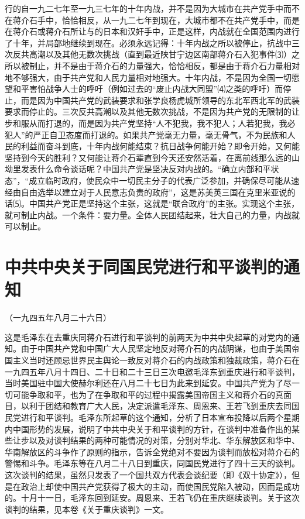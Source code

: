 \documentclass[UTF-8, a5paper, 12pt]{ctexart}
\begin{document}
行的自一九二七年至一九三七年的十年内战，并不是因为大城市在共产党手中而不在蒋介石手中，恰恰相反，从一九二七年到现在，大城市都不在共产党手中，而是在蒋介石或蒋介石所让与的日本和汉奸手中，正是这样，内战就在全国范围内进行了十年，并局部地继续到现在。必须永远记得：十年内战之所以被停止，抗战中三次反共高潮以及其他无数次挑战（直到最近陕甘宁边区南部蒋介石入犯事件⑶）之所以被制止，并不是由于蒋介石的力量强大，恰恰相反，都是由于蒋介石力量相对地不够强大，由于共产党和人民力量相对地强大。十年内战，不是因为全国一切愿望和平害怕战争人士的呼吁（例如过去的“废止内战大同盟”⑷之类的呼吁）而停止，而是因为中国共产党的武装要求和张学良杨虎城所领导的东北军西北军的武装要求而停止的。三次反共高潮以及其他无数次挑战，不是因为共产党的无限制的让步和服从而打退的，而是因为共产党坚持“人不犯我，我不犯人；人若犯我，我必犯人”的严正自卫态度而打退的。如果共产党毫无力量，毫无骨气，不为民族和人民的利益而奋斗到底，十年内战何能结束？抗日战争何能开始？即令开始，又何能坚持到今天的胜利？又何能让蒋介石辈直到今天还安然活着，在离前线那么远的山坳里发表什么命令谈话呢？中国共产党是坚决反对内战的。“确立内部和平状态”，“成立临时政府，使民众中一切民主分子的代表广泛参加，并确保尽可能从速经由自由选举以建立对于人民意志负责的政府”，这是苏美英三国在克里米亚说的话⑸。中国共产党正是坚持这个主张，这就是“联合政府”的主张。实现这个主张，就可制止内战。一个条件：要力量。全体人民团结起来，壮大自己的力量，内战就可以制止。

\section{中共中央关于同国民党进行和平谈判的通知}

（一九四五年八月二十六日）

这是毛泽东在去重庆同蒋介石进行和平谈判的前两天为中共中央起草的对党内的通知。由于中国共产党和中国广大人民坚定地反对蒋介石的内战阴谋，也由于美国帝国主义当时还顾忌世界民主舆论一致反对蒋介石的内战政策和独裁政策，蒋介石在一九四五年八月十四日、二十日和二十三日三次电邀毛泽东到重庆进行和平谈判，当时美国驻中国大使赫尔利还在八月二十七日为此来到延安。中国共产党为了尽一切可能争取和平，也为了在争取和平的过程中揭露美国帝国主义和蒋介石的真面目，以利于团结和教育广大人民，决定派遣毛泽东、周恩来、王若飞到重庆去同国民党进行和平谈判。毛泽东所起草的这个通知，分析了日本宣布投降以后两个星期内中国形势的发展，说明了中共中央关于和平谈判的方针，在谈判中准备作出的某些让步以及对谈判结果的两种可能情况的对策，分别对华北、华东解放区和华中、华南解放区的斗争作了原则的指示，告诉全党绝对不要因为谈判而放松对蒋介石的警惕和斗争。毛泽东等在八月二十八日到重庆，同国民党进行了四十三天的谈判。这次谈判的结果，虽然只发表了一个国共双方代表会谈纪要（即《双十协定》），但是在政治上却使中国共产党获得了极大的主动，而使国民党陷入被动，因而是成功的。十月十一日，毛泽东回到延安。周恩来、王若飞仍在重庆继续谈判。关于这次谈判的结果，见本卷《关于重庆谈判》一文。
\end{document}
